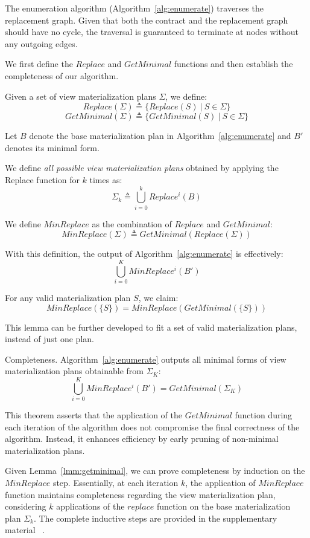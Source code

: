 \medskip{} The enumeration algorithm (Algorithm~\ref{alg:enumerate}) traverses the replacement graph. Given that both the contract and the replacement graph should have no cycle, the traversal is guaranteed to terminate at nodes without any outgoing edges.
    

\medskip {}
We first define the $Replace$ and $GetMinimal$ functions and then establish the completeness of our algorithm.

Given a set of view materialization plans $\Sigma$, we define:
\[ Replace(\Sigma) \triangleq \{ Replace(S) ~|~ S \in \Sigma \} \]
\[ GetMinimal(\Sigma) \triangleq \{ GetMinimal(S) ~|~ S \in \Sigma \} \]

Let $B$ denote the base materialization plan in Algorithm~\ref{alg:enumerate} and $B'$ denotes its minimal form.
\begin{deff}
We define {\em all possible view materialization plans} obtained by applying the Replace function for $k$ times as:
       \[ \Sigma_k \triangleq \bigcup_{i=0}^{k} Replace^i(B) \] 
\end{deff}

\begin{deff}\label{def:min-replace}
We define $MinReplace$ as the combination of $Replace$ and $GetMinimal$:
        \[ MinReplace(\Sigma) \triangleq GetMinimal(Replace(\Sigma))  \]
\end{deff}
        
With this definition, the output of Algorithm~\ref{alg:enumerate} is effectively:
\[  \bigcup_{i=0}^{K}MinReplace^i(B') \]

\begin{lmm}\label{lmm:getminimal}
For any valid materialization plan $S$, we claim:
\[
    MinReplace(\{S\}) = MinReplace(GetMinimal(\{S\}))
\]
\end{lmm}

This lemma can be further developed to fit a set of valid materialization plans,
instead of just one plan.

\begin{thm}\label{theorem:completeness}{Completeness.}
Algorithm~\ref{alg:enumerate} outputs all minimal forms of view materialization plans obtainable from $\Sigma_K$:
        \[ \bigcup_{i=0}^{K}MinReplace^i(B') =  GetMinimal(\Sigma_K) \]
\end{thm}

This theorem asserts that the application of the $GetMinimal$ function during each iteration of the algorithm does not compromise the final correctness of the algorithm. Instead, it enhances efficiency by early pruning of non-minimal materialization plans.
    

Given Lemma~\ref {lmm:getminimal}, we can prove completeness by induction on the $MinReplace$ step. 
Essentially, at each iteration $k$, the application of $MinReplace$ function maintains completeness regarding the view materialization plan, 
considering $k$ applications of the $replace$ function on the base materialization plan $\Sigma_k$.
The complete inductive steps are provided in the supplementary material ~\cite{proof}.

